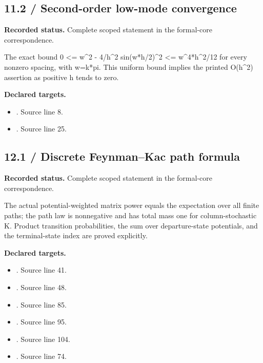 \subsection{11.2 / Second-order low-mode convergence}
\label{result:11.2}
\textbf{Recorded status.} Complete scoped statement in the formal-core correspondence.\par
The exact bound 0 <= w\textasciicircum{}2 - 4/h\textasciicircum{}2 sin(w*h/2)\textasciicircum{}2 <= w\textasciicircum{}4*h\textasciicircum{}2/12 for every nonzero spacing, with w=k*pi. This uniform bound implies the printed O(h\textasciicircum{}2) assertion as positive h tends to zero.

\textbf{Declared targets.}\begin{itemize}
\item {}. Source line 8.
\item {}. Source line 25.
\end{itemize}
\subsection{12.1 / Discrete Feynman--Kac path formula}
\label{result:12.1}
\textbf{Recorded status.} Complete scoped statement in the formal-core correspondence.\par
The actual potential-weighted matrix power equals the expectation over all finite paths; the path law is nonnegative and has total mass one for column-stochastic K. Product transition probabilities, the sum over departure-state potentials, and the terminal-state index are proved explicitly.

\textbf{Declared targets.}\begin{itemize}
\item {}. Source line 41.
\item {}. Source line 48.
\item {}. Source line 85.
\item {}. Source line 95.
\item {}. Source line 104.
\item {}. Source line 74.
\end{itemize}
